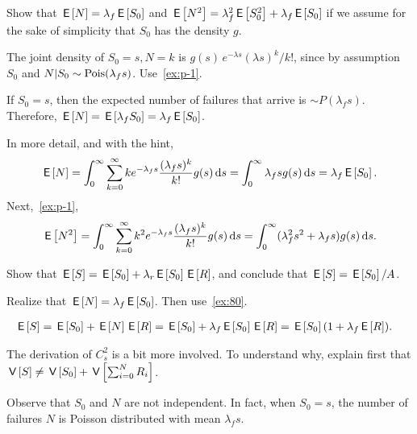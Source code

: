 \begin{exercise}\label{ex:f-3}
Show
that $\,\mathsf{E}\left[N\right] = \lambda_f \,\mathsf{E}\left[S_0\right]$ and $\,\mathsf{E}\left[N^2\right] = \lambda_f^2 \,\mathsf{E}\left[S_0^2\right] + \lambda_f \,\mathsf{E}\left[S_0\right]$
if we assume for the sake of simplicity that $S_0$ has the density $g$.
\begin{hint}
  The joint density of $S_0=s, N=k$ is $g(s)\, e^{-\lambda s}(\lambda s)^k/{k!}$, since by assumption $S_0$ and $N| S_{0}\sim \mathrm{Pois}(\lambda_{f} s)$.
  Use~\cref{ex:p-1}.
\end{hint}
\begin{solution}
  If $S_0=s$, then the expected number of failures that arrive is $\sim P(\lambda_f s)$.
  Therefore, $\,\mathsf{E}\left[N\right] = \,\mathsf{E}\left[\lambda_f S_0\right] = \lambda_f \,\mathsf{E}\left[S_0\right]$.

  In more detail, and with the hint,
  \begin{equation*}
    \,\mathsf{E}\left[N\right] = \int_0^\infty \sum_{k=0}^\infty k e^{-\lambda_f s}\frac{(\lambda_f s)^k}{k!} g(s) \,\textrm{d}s = \int_0^\infty \lambda_f s g(s) \,\textrm{d}s = \lambda_f \,\mathsf{E}\left[S_0\right].
  \end{equation*}
Next,~\cref{ex:p-1},
  \begin{equation*}
    \,\mathsf{E}\left[N^2\right] = \int_0^\infty \sum_{k=0}^\infty k^2 e^{-\lambda_f s}\frac{(\lambda_f s)^k}{k!} g(s) \,\textrm{d}s = \int_0^\infty (\lambda_f^2 s^2 + \lambda_f s) g(s) \,\textrm{d}s.
  \end{equation*}
\end{solution}
\end{exercise}


\begin{exercise}\label{ex:f-16}
 Show that $\,\mathsf{E}\left[S\right] = \,\mathsf{E}\left[S_0\right] + \lambda_r \,\mathsf{E}\left[S_0\right] \,\mathsf{E}\left[R\right]$, and  conclude that $\,\mathsf{E}\left[S\right] = \,\mathsf{E}\left[S_0\right]/A$.
\begin{hint}
 Realize that $\,\mathsf{E}\left[N\right] = \lambda_f \,\mathsf{E}\left[S_0\right]$. Then use~\cref{ex:80}.
\end{hint}
\begin{solution}
 \begin{align*}
   \,\mathsf{E}\left[S\right] &= \,\mathsf{E}\left[S_0\right] + \,\mathsf{E}\left[N\right] \,\mathsf{E}\left[R\right] = \,\mathsf{E}\left[S_0\right] + \lambda_f \,\mathsf{E}\left[S_0\right] \,\mathsf{E}\left[R\right]= \,\mathsf{E}\left[S_0\right](1+\lambda_f \,\mathsf{E}\left[R\right]).
 \end{align*}
\end{solution}
\end{exercise}



\begin{exercise}\label{ex:l-159}
 The derivation of $C_s^2$ is a bit more involved.
To understand why,  explain first that $\,\mathsf{V}\left[S\right] \neq \,\mathsf{V}\left[S_0\right] + \,\mathsf{V}\left[\sum_{i=0}^N R_i\right]$.
\begin{solution}
 Observe that $S_0$ and $N$ are not independent. In fact, when $S_0=s$, the number of failures $N$ is Poisson distributed with mean $\lambda_f s$.
\end{solution}
\end{exercise}



